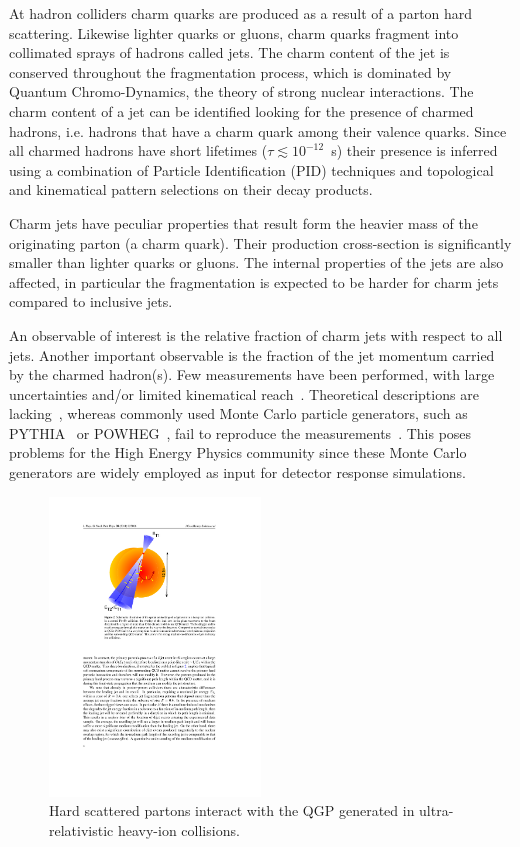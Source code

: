 \documentclass[12pt, a4paper, twoside, titlepage]{article}
\begin{document}
At hadron colliders charm quarks are produced as a result of a parton hard scattering. Likewise lighter quarks or gluons, charm quarks
fragment into collimated sprays of hadrons called jets. The charm content of the jet is conserved throughout the fragmentation process,
which is dominated by Quantum Chromo-Dynamics, the theory of strong nuclear interactions.
The charm content of a jet can be identified looking for the presence of charmed hadrons, i.e. hadrons that have
a charm quark among their valence quarks. Since all charmed hadrons have short lifetimes ($\tau \lesssim 10^{-12}$~s) their presence is inferred
using a combination of Particle Identification (PID) techniques and topological and kinematical pattern selections on their decay products.

Charm jets have peculiar properties that result form the heavier mass of the originating parton (a charm quark).
Their production cross-section is significantly smaller than lighter quarks or gluons. The internal
properties of the jets are also affected, in particular the fragmentation is expected to be harder for charm jets compared to inclusive jets.

An observable of interest is the relative fraction of charm jets with respect to all jets. Another important observable is the fraction of the jet momentum carried by
the charmed hadron(s). Few measurements have been performed, 
with large uncertainties and/or limited kinematical reach~\cite{}. Theoretical descriptions are lacking~\cite{}, whereas commonly used Monte Carlo particle
generators, such as PYTHIA~\cite{Sjostrand:2006} or POWHEG~\cite{}, fail to reproduce the measurements~\cite{}. 
This poses problems for the High Energy Physics community since these Monte Carlo generators are widely employed as input for detector response simulations.

\begin{figure}[tbh]
\begin{center}
\includegraphics[width=0.5\textwidth]{img/jetquenching}
 \caption{Hard scattered partons interact with the QGP generated in ultra-relativistic heavy-ion collisions.} 
 \label{fig:jetquenching}
\end{center}
\end{figure}
\end{document}
